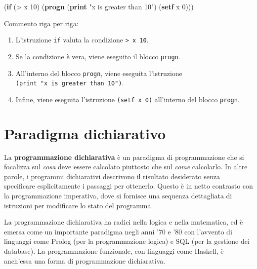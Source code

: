 \documentclass[
  letterpaper,
]{scrbook}
\newenvironment{Shaded}{\begin{snugshade}}{\end{snugshade}}
\newcommand{\DecValTok}[1]{\textcolor[rgb]{0.68,0.00,0.00}{#1}}
\newcommand{\KeywordTok}[1]{\textcolor[rgb]{0.00,0.23,0.31}{\textbf{#1}}}
\newcommand{\NormalTok}[1]{\textcolor[rgb]{0.00,0.23,0.31}{#1}}
\newcommand{\OperatorTok}[1]{\textcolor[rgb]{0.37,0.37,0.37}{#1}}
\newcommand{\StringTok}[1]{\textcolor[rgb]{0.13,0.47,0.30}{#1}}
\providecommand{\tightlist}{%
  \setlength{\itemsep}{0pt}\setlength{\parskip}{0pt}}\usepackage{longtable,booktabs,array}
\begin{document}
\begin{Shaded}
\begin{Highlighting}[]
\NormalTok{(}\KeywordTok{if}\NormalTok{ (}\OperatorTok{\textgreater{}}\NormalTok{ x }\DecValTok{10}\NormalTok{)                        }
\NormalTok{    (}\KeywordTok{progn}                        
\NormalTok{      (}\KeywordTok{print} \StringTok{"x is greater than 10"}\NormalTok{) }
\NormalTok{      (}\KeywordTok{setf}\NormalTok{ x }\DecValTok{0}\NormalTok{)))                   }
\end{Highlighting}
\end{Shaded}

Commento riga per riga:

\begin{enumerate}
\def\labelenumi{\arabic{enumi}.}
\tightlist
\item
  L'istruzione \texttt{if} valuta la condizione
  \texttt{\textgreater{}\ x\ 10}.
\item
  Se la condizione è vera, viene eseguito il blocco \texttt{progn}.
\item
  All'interno del blocco \texttt{progn}, viene eseguita l'istruzione
  \texttt{(print\ "x\ is\ greater\ than\ 10")}.
\item
  Infine, viene eseguita l'istruzione \texttt{(setf\ x\ 0)} all'interno
  del blocco \texttt{progn}.
\end{enumerate}

\section{Paradigma dichiarativo}\label{paradigma-dichiarativo}

La \textbf{programmazione dichiarativa} è un paradigma di programmazione
che si focalizza sul \emph{cosa} deve essere calcolato piuttosto che sul
\emph{come} calcolarlo. In altre parole, i programmi dichiarativi
descrivono il risultato desiderato senza specificare esplicitamente i
passaggi per ottenerlo. Questo è in netto contrasto con la
programmazione imperativa, dove si fornisce una sequenza dettagliata di
istruzioni per modificare lo stato del programma.

La programmazione dichiarativa ha radici nella logica e nella
matematica, ed è emersa come un importante paradigma negli anni '70 e
'80 con l'avvento di linguaggi come Prolog (per la programmazione
logica) e SQL (per la gestione dei database). La programmazione
funzionale, con linguaggi come Haskell, è anch'essa una forma di
programmazione dichiarativa.
\end{document}
